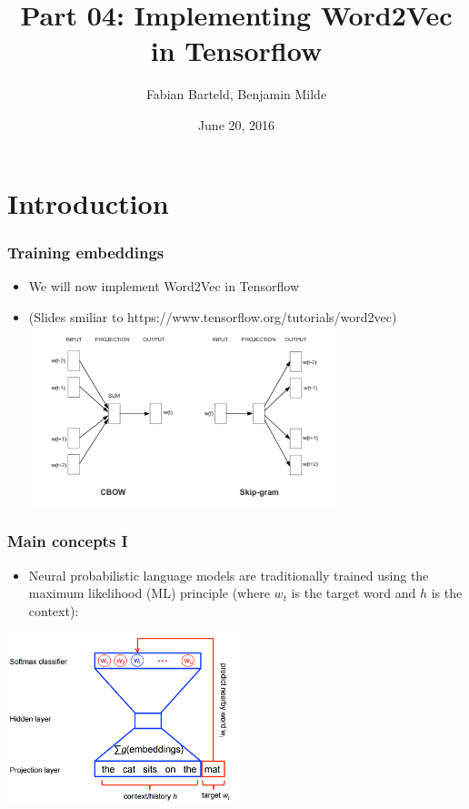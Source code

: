 \documentclass{beamer}
\title{Part 04: Implementing Word2Vec in Tensorflow}
\author{Fabian Barteld, Benjamin Milde}
\date[20.06.2016]{June 20, 2016}
\begin{document}
\maketitle

%
%

\section{Introduction}

\begin{frame}[fragile]
\frametitle{Training embeddings}
  \begin{itemize}
	\item We will now implement Word2Vec in Tensorflow
	\item (Slides smiliar to https://www.tensorflow.org/tutorials/word2vec)
	\includegraphics[width=0.7\textwidth]{04_skipgram_vs_cbow}
  \end{itemize}
\end{frame}

\begin{frame}
  \frametitle{Main concepts I}
  \begin{itemize}
     
    \item  Neural probabilistic language models are traditionally trained using the maximum likelihood (ML) principle (where $w_t$ is the target word and $h$ is the context):
	 
	 \end{itemize}

\begin{center}
\includegraphics[width=0.5\textwidth]{04_w2v_01}
\end{center}	 
	 
\end{frame}
\end{document}
